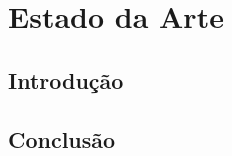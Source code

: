 \chapter{Estado da Arte}
\label{ch::state-art}

\section{Introdução}
\label{sec::state-art:intro}

\section{Conclusão}
\label{sec::state-art:conc}
